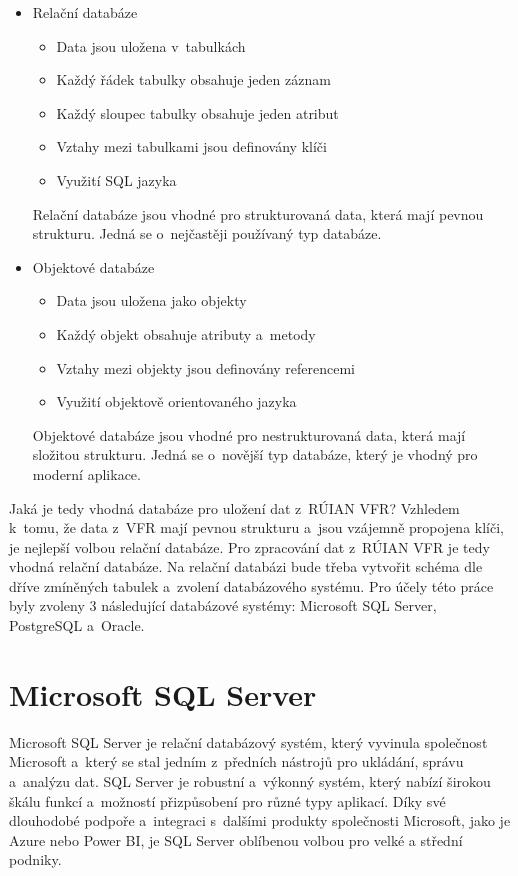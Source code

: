 \documentclass[czech, kiv, ba, he, iso690numb, pdf]{fasthesis}
\begin{document}
\begin{itemize}
    \item Relační databáze
    \begin{itemize}[itemsep=-1pt]
        \item Data jsou uložena v~tabulkách
        \item Každý řádek tabulky obsahuje jeden záznam
        \item Každý sloupec tabulky obsahuje jeden atribut
        \item Vztahy mezi tabulkami jsou definovány klíči
        \item Využití SQL jazyka
    \end{itemize}
    Relační databáze jsou vhodné pro strukturovaná data, která mají pevnou strukturu.
    Jedná se o~nejčastěji používaný typ databáze.

    \item Objektové databáze
    \begin{itemize}[itemsep=-1pt]
        \item Data jsou uložena jako objekty
        \item Každý objekt obsahuje atributy a~metody
        \item Vztahy mezi objekty jsou definovány referencemi
        \item Využití objektově orientovaného jazyka
    \end{itemize}
    Objektové databáze jsou vhodné pro nestrukturovaná data, která mají složitou strukturu.
    Jedná se o~novější typ databáze, který je vhodný pro moderní aplikace.
\end{itemize}

Jaká je tedy vhodná databáze pro uložení dat z~RÚIAN VFR?
Vzhledem k~tomu, že data z~VFR mají pevnou strukturu a~jsou vzájemně propojena klíči, 
je nejlepší volbou relační databáze. Pro zpracování dat z~RÚIAN VFR je tedy vhodná relační databáze.
Na relační databázi bude třeba vytvořit schéma dle dříve zmíněných tabulek a~zvolení databázového systému.
Pro účely této práce byly zvoleny 3 následující databázové systémy: Microsoft SQL Server, PostgreSQL a~Oracle.

\section{Microsoft SQL Server}
Microsoft SQL Server je relační databázový systém, který vyvinula společnost 
Microsoft a~který se stal jedním z~předních nástrojů pro ukládání, správu a~analýzu dat. 
SQL Server je robustní a~výkonný systém, který nabízí širokou škálu funkcí 
a~možností přizpůsobení pro různé typy aplikací. Díky své dlouhodobé podpoře a~integraci 
s~dalšími produkty společnosti Microsoft, jako je Azure nebo Power BI, je SQL Server 
oblíbenou volbou pro velké a střední podniky.
\end{document}
